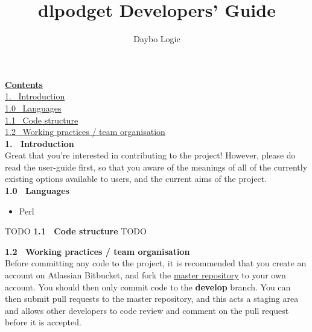 \documentclass{article}
\begin{document}
\title{dlpodget Developers' Guide}\author{Daybo Logic}
\maketitle

\par\vspace*{\fill}
\begin{center}

\end{center}

\newpage
\par \textbf{\underline{Contents}}
\\
\href{#intro}{1.~ Introduction}
\\
\href{#langs}{1.0~ Languages}
\\
\href{#struct}{1.1~ Code structure}
\\
\href{#struct}{1.2~ Working practices / team organisation}
\\

\newpage
\textbf{1.~ Introduction}
\\
Great that you're interested in contributing to the project!  However, please do read the user-guide
first, so that you aware of the meanings of all of the currently existing options available to users,
and the current aims of the project.
\\
\textbf{1.0~ Languages}
\begin{itemize}
\item Perl
\end{itemize}
TODO
\textbf{1.1~ Code structure}
TODO

\newpage
\textbf{1.2~ Working practices / team organisation}
\\
Before committing any code to the project, it is recommended that you create an account
on Atlassian Bitbucket, and fork the \href{https://bitbucket.org/daybologic/dlpodget}{master repository}
to your own account.  You should then only commit code to the \textbf{develop} branch.  You can then
submit pull requests to the master repository, and this acts a staging area and allows other developers
to code review and comment on the pull request before it is accepted.
\end{document}
